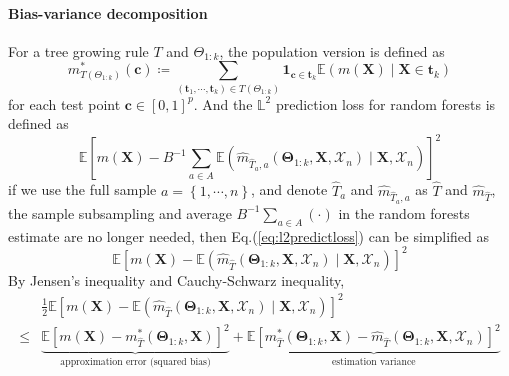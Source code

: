 \documentclass[twoside]{article}
\begin{document}
\paragraph*{Bias-variance decomposition}
For a tree growing rule $T$ and $\Theta_{1:k}$, the population version is defined as 
\begin{equation}
    m^*_{T(\Theta_{1:k})}(\mathbf{c}) \coloneq \sum_{\left(\mathbf{t}_1,\cdots,\mathbf{t}_k\right)\in T(\Theta_{1:k})} \mathbf{1}_{\mathbf{c}\in\mathbf{t}_k}\mathbb{E}\left(m(\mathbf{X})\mid \mathbf{X}\in \mathbf{t}_k\right)
\end{equation}
for each test point $\mathbf{c}\in [0,1]^p$. And the $\mathbb{L}^2$ prediction loss for random forests is defined as 
\begin{equation}\label{eq:l2predictloss}
    \mathbb{E}\left[ m(\mathbf{X}) - B^{-1}\sum_{a\in A}\mathbb{E}\left( \hat{m}_{\hat{T}_a,a} \left(\boldsymbol{\Theta}_{1:k},\mathbf{X},\mathcal{X}_n\right)\mid \mathbf{X},\mathcal{X}_n \right) \right]^2
\end{equation}
if we use the full sample $a=\left\{1,\cdots,n\right\}$, and denote $\hat{T}_a$ and $\hat{m}_{\hat{T}_a,a}$ as $\hat{T}$ and $\hat{m}_{\hat{T}}$, the sample subsampling and average $B^{-1}\sum_{a\in A}\left(\cdot\right)$ in the random forests estimate are no 
longer needed, then Eq.(\ref{eq:l2predictloss}) can be simplified as 
\begin{equation*}
    \mathbb{E} \left[m(\mathbf{X})-\mathbb{E}\left(\hat{m}_{\hat{T}}\left(\boldsymbol{\Theta}_{1:k},\mathbf{X},\mathcal{X}_n\right) \mid \mathbf{X},\mathcal{X}_n\right)\right]^2
\end{equation*}
By Jensen's inequality and Cauchy-Schwarz inequality,
\begin{align*}
    &\frac{1}{2}\mathbb{E} \left[m(\mathbf{X}) - \mathbb{E}\left(\hat{m}_{\hat{T}} \left(\boldsymbol{\Theta}_{1:k},\mathbf{X},\mathcal{X}_n\right) \mid \mathbf{X},\mathcal{X}_n\right)\right]^2 \\
    \leq & \underbrace{\mathbb{E}\left[m(\mathbf{X}) - m^*_{\hat{T}} \left(\boldsymbol{\Theta}_{1:k},\mathbf{X}\right) \right]^2}_{\text{approximation error (squared bias)}} + \underbrace{\mathbb{E} \left[m^*_{\hat{T}}\left(\boldsymbol{\Theta}_{1:k},\mathbf{X}\right) -\hat{m}_{\hat{T}}\left(\boldsymbol{\Theta}_{1:k},\mathbf{X},\mathcal{X}_n\right)\right]^2}_{\text{estimation variance}}
\end{align*}
\end{document}
